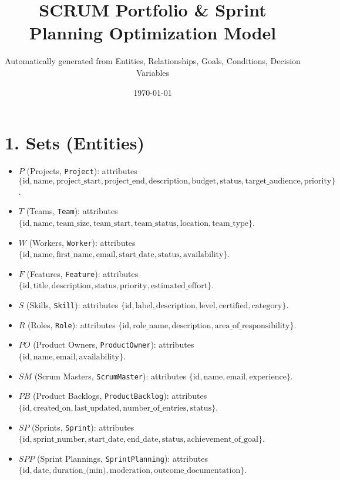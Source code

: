 \documentclass[11pt,a4paper]{article}
\title{SCRUM Portfolio \& Sprint Planning Optimization Model}
\author{Automatically generated from Entities, Relationships, Goals, Conditions, Decision Variables}
\date{\today}
\begin{document}
\maketitle
\tableofcontents
\newpage

\section{1. Sets (Entities)}
\begin{itemize}
  \item $P$ (Projects, \texttt{Project}): attributes $\{\text{id},\text{name},\text{project\_start},\text{project\_end},\text{description},\text{budget},\text{status},\text{target\_audience},\text{priority}\}$.
  \item $T$ (Teams, \texttt{Team}): attributes $\{\text{id},\text{name},\text{team\_size},\text{team\_start},\text{team\_status},\text{location},\text{team\_type}\}$.
  \item $W$ (Workers, \texttt{Worker}): attributes $\{\text{id},\text{name},\text{first\_name},\text{email},\text{start\_date},\text{status},\text{availability}\}$.
  \item $F$ (Features, \texttt{Feature}): attributes $\{\text{id},\text{title},\text{description},\text{status},\text{priority},\text{estimated\_effort}\}$.
  \item $S$ (Skills, \texttt{Skill}): attributes $\{\text{id},\text{label},\text{description},\text{level},\text{certified},\text{category}\}$.
  \item $R$ (Roles, \texttt{Role}): attributes $\{\text{id},\text{role\_name},\text{description},\text{area\_of\_responsibility}\}$.
  \item $PO$ (Product Owners, \texttt{ProductOwner}): attributes $\{\text{id},\text{name},\text{email},\text{availability}\}$.
  \item $SM$ (Scrum Masters, \texttt{ScrumMaster}): attributes $\{\text{id},\text{name},\text{email},\text{experience}\}$.
  \item $PB$ (Product Backlogs, \texttt{ProductBacklog}): attributes $\{\text{id},\text{created\_on},\text{last\_updated},\text{number\_of\_entries},\text{status}\}$.
  \item $SP$ (Sprints, \texttt{Sprint}): attributes $\{\text{id},\text{sprint\_number},\text{start\_date},\text{end\_date},\text{status},\text{achievement\_of\_goal}\}$.
  \item $SPP$ (Sprint Plannings, \texttt{SprintPlanning}): attributes $\{\text{id},\text{date},\text{duration\_(min)},\text{moderation},\text{outcome\_documentation}\}$.

\end{itemize}
\end{document}
